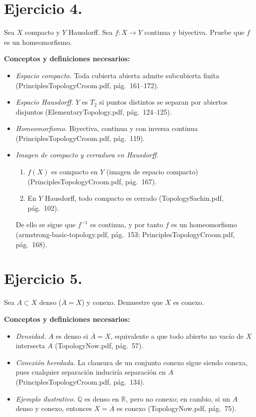 \documentclass[a4paper,11pt]{article}  %
\begin{document}
\bigskip

\section*{Ejercicio 4.} 
Sea \(X\) compacto y \(Y\) Hausdorff. Sea \(f\colon X\to Y\) continua y biyectiva. Pruebe que \(f\) es un homeomorfismo.

\medskip
\textbf{Conceptos y definiciones necesarios:}
\begin{itemize}
  \item \emph{Espacio compacto.}  
    Toda cubierta abierta admite subcubierta finita (PrinciplesTopologyCroom.pdf, pág.\ 161–172).
  \item \emph{Espacio Hausdorff.}  
    \(Y\) es \(T_2\) si puntos distintos se separan por abiertos disjuntos (ElementaryTopology.pdf, pág.\ 124–125).
  \item \emph{Homeomorfismo.}  
    Biyectiva, continua y con inversa continua (PrinciplesTopologyCroom.pdf, pág.\ 119).
  \item \emph{Imagen de compacto y cerradura en Hausdorff.}  
    \begin{enumerate}
      \item \(f(X)\) es compacto en \(Y\) (imagen de espacio compacto) (PrinciplesTopologyCroom.pdf, pág.\ 167).
      \item En \(Y\) Hausdorff, todo compacto es cerrado (TopologySachin.pdf, pág.\ 102).
    \end{enumerate}
    De ello se sigue que \(f^{-1}\) es continua, y por tanto \(f\) es un homeomorfismo (armstrong-basic-topology.pdf, pág.\ 153; PrinciplesTopologyCroom.pdf, pág.\ 168).
\end{itemize}

\bigskip

\section*{Ejercicio 5.} 
Sea \(A\subset X\) denso (\(\overline A = X\)) y conexo. Demuestre que \(X\) es conexo.

\medskip
\textbf{Conceptos y definiciones necesarios:}
\begin{itemize}
  \item \emph{Densidad.}  
    \(A\) es denso si \(\overline A = X\), equivalente a que todo abierto no vacío de \(X\) intersecta \(A\) (TopologyNow.pdf, pág.\ 57).
  \item \emph{Conexión heredada.}  
    La clausura de un conjunto conexo sigue siendo conexa, pues cualquier separación induciría separación en \(A\) (PrinciplesTopologyCroom.pdf, pág.\ 134).
  \item \emph{Ejemplo ilustrativo.}  
    \(\mathbb{Q}\) es denso en \(\mathbb{R}\), pero no conexo; en cambio, si un \(A\) denso y conexo, entonces \(X=\overline A\) es conexo (TopologyNow.pdf, pág.\ 75).
\end{itemize}
\end{document}
